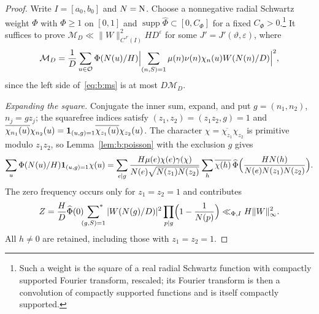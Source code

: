 \begin{proof}
Write $I=[a_0,b_0]$ and $N=\mathrm{N}$. Choose a nonnegative radial Schwartz weight $\Phi$ with $\Phi\ge1$ on $[0,1]$ and $\operatorname{supp}\widehat\Phi\subset[0,C_\Phi]$ for a fixed $C_\Phi>0$.\footnote{Such a weight is the square of a real radial Schwartz function with compactly supported Fourier transform, rescaled; its Fourier transform is then a convolution of compactly supported functions and is itself compactly supported.} It suffices to prove $\mathcal M_D\ll\|W\|^2_{C^{J'}(I)}HD^\varepsilon$ for some $J'=J'(\vartheta,\varepsilon)$, where
\begin{equation}\label{eq:b:expandedms}
  \mathcal M_D=\frac1D\sum_{u\in\mathcal{O}}\Phi(N(u)/H)\Bigl|\sum_{(n,S)=1}\mu(n)\nu(n)\chi_n(u)W(N(n)/D)\Bigr|^2,
\end{equation}
since the left side of~\eqref{eq:b:ms} is at most $D\mathcal M_D$.

\emph{Expanding the square.} Conjugate the inner sum, expand, and put $g=(n_1,n_2)$, $n_j=gz_j$; the squarefree indices satisfy $(z_1,z_2)=(z_1z_2,g)=1$ and $\overline{\chi_{n_1}(u)}\chi_{n_2}(u)=\mathbf{1}_{(u,g)=1}\overline{\chi_{z_1}(u)}\chi_{z_2}(u)$. The character $\chi=\overline{\chi_{z_1}}\chi_{z_2}$ is primitive modulo $z_1z_2$, so Lemma~\ref{lem:b:poisson} with the exclusion $g$ gives
\begin{equation}\label{eq:b:initialrows}
  \sum_u\Phi(N(u)/H)\mathbf{1}_{(u,g)=1}\chi(u)=\sum_{e\mid g}\frac{H\mu(e)\chi(e)\gamma(\chi)}{N(e)\sqrt{N(z_1)N(z_2)}}\sum_h\overline{\chi(h)}\,\widehat\Phi\Bigl(\frac{HN(h)}{N(e)N(z_1)N(z_2)}\Bigr).
\end{equation}
The zero frequency occurs only for $z_1=z_2=1$ and contributes
\[
  Z=\frac HD\widehat\Phi(0)\sideset{}{^*}\sum_{(g,S)=1}|W(N(g)/D)|^2\prod_{p\mid g}\Bigl(1-\frac1{N(p)}\Bigr)\ll_{\Phi,I}H\|W\|_\infty^2.
\]
All $h\ne0$ are retained, including those with $z_1=z_2=1$.


\end{proof}
